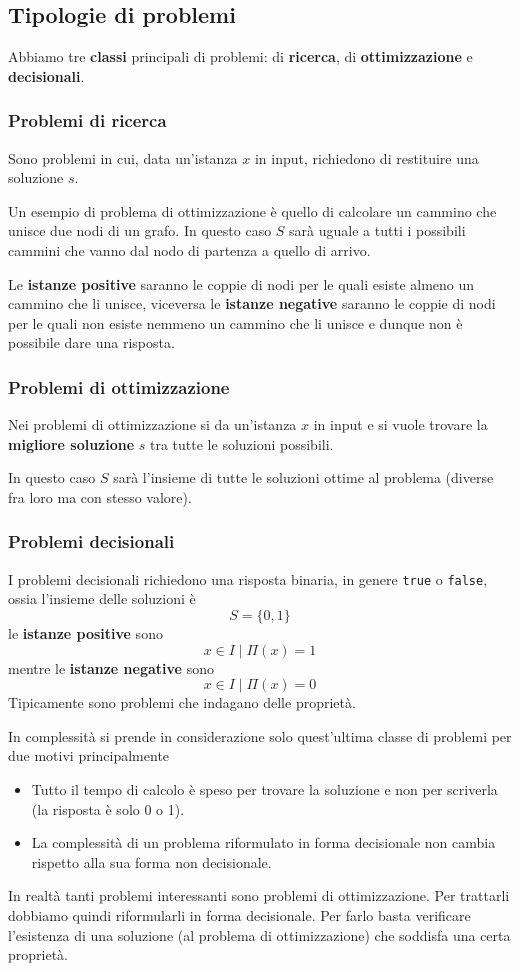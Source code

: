 \subsection{Tipologie di problemi}
Abbiamo tre \textbf{classi} principali di problemi: di \textbf{ricerca}, di \textbf{ottimizzazione} e
\textbf{decisionali}.

\subsubsection{Problemi di ricerca}
Sono problemi in cui, data un'istanza $x$ in input, richiedono di restituire una soluzione $s$.

Un esempio di problema di ottimizzazione \`e quello di calcolare un cammino che unisce due nodi di un grafo. In questo
caso $S$ sar\`a uguale a tutti i possibili cammini che vanno dal nodo di partenza a quello di arrivo.

Le \textbf{istanze positive} saranno le coppie di nodi per le quali esiste almeno un cammino che li unisce, viceversa
le \textbf{istanze negative} saranno le coppie di nodi per le quali non esiste nemmeno un cammino che li unisce e dunque
non \`e possibile dare una risposta.

\subsubsection{Problemi di ottimizzazione}
Nei problemi di ottimizzazione si da un'istanza $x$ in input e si vuole trovare la \textbf{migliore soluzione} $s$ tra
tutte le soluzioni possibili.

In questo caso $S$ sar\`a l'insieme di tutte le soluzioni ottime al problema (diverse fra loro ma con stesso valore).

\subsubsection{Problemi decisionali}
I problemi decisionali richiedono una risposta binaria, in genere \verb|true| o \verb|false|, ossia l'insieme delle
soluzioni \`e
\[ S = \{ 0, 1 \} \]
le \textbf{istanze positive} sono
\[ x \in I \mid \Pi(x) = 1 \]
mentre le \textbf{istanze negative} sono
\[ x \in I \mid \Pi(x) = 0 \]
Tipicamente sono problemi che indagano delle propriet\`a.

In complessit\`a si prende in considerazione solo quest'ultima classe di problemi per due motivi principalmente
\begin{itemize}
	\item Tutto il tempo di calcolo \`e speso per trovare la soluzione e non per scriverla (la risposta \`e solo 0 o 1).
	\item La complessit\`a di un problema riformulato in forma decisionale non cambia rispetto alla sua forma non
	      decisionale.
\end{itemize}
In realt\`a tanti problemi interessanti sono problemi di ottimizzazione. Per trattarli dobbiamo quindi riformularli in
forma decisionale. Per farlo basta verificare l'esistenza di una soluzione (al problema di ottimizzazione) che soddisfa
una certa propriet\`a.


